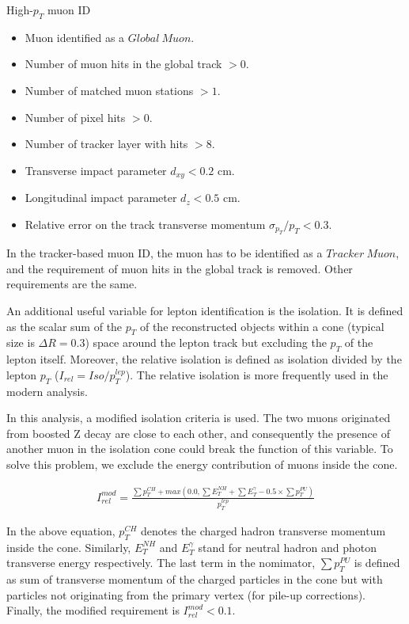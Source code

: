 High-$p_{T}$ muon ID
\begin{itemize}
\item Muon identified as a $Global~Muon$.
\item Number of muon hits in the global track $> 0$.
\item Number of matched muon stations $> 1$.
\item Number of pixel hits $> 0$.
\item Number of tracker layer with hits $> 8$.
\item Transverse impact parameter $d_{xy} < 0.2$ cm.
\item Longitudinal impact parameter $d_{z} < 0.5$ cm.
\item Relative error on the track transverse momentum $\sigma_{p_{T}}/p_{T} < 0.3$.\\
\end{itemize}

In the tracker-based muon ID, the muon has to be identified as a $Tracker~Muon$, and the requirement of muon hits in the global track is removed. Other requirements are the same.

An additional useful variable for lepton identification is the isolation. It is defined as the scalar sum of the $p_{T}$ of the reconstructed objects within a cone (typical size is $\Delta R=0.3$) space around the lepton track but excluding the $p_{T}$ of the lepton itself. Moreover, the relative isolation is defined as isolation divided by the lepton $p_{T}$ ($I_{rel} = Iso/p_{T}^{lep}$). The relative isolation is more frequently used in the modern analysis.

In this analysis, a modified isolation criteria is used. The two muons originated from boosted Z decay are close to each other, and consequently the presence of another muon in the isolation cone could break the function of this variable. To solve this problem, we exclude the energy contribution of muons inside the cone.

\begin{align}
  \label{eq:ModIso}
  I_{rel}^{mod}=\frac{\sum p_{T}^{CH}+max(0.0 , \sum E_{T}^{NH}+\sum E_{T}^{\gamma}-0.5\times \sum p_{T}^{PU})}{p_{T}^{lep}}
\end{align}

In the above equation, $p_{T}^{CH}$ denotes the charged hadron transverse momentum inside the cone. Similarly, $E_{T}^{NH}$ and $E_{T}^{\gamma}$ stand for neutral hadron and photon transverse energy respectively. The last term in the nomimator, $\sum p_{T}^{PU}$ is defined as sum of transverse momentum of the charged particles in the cone but with particles not originating from the primary vertex (for pile-up corrections). Finally, the modified requirement is $I_{rel}^{mod} < 0.1$.\\

